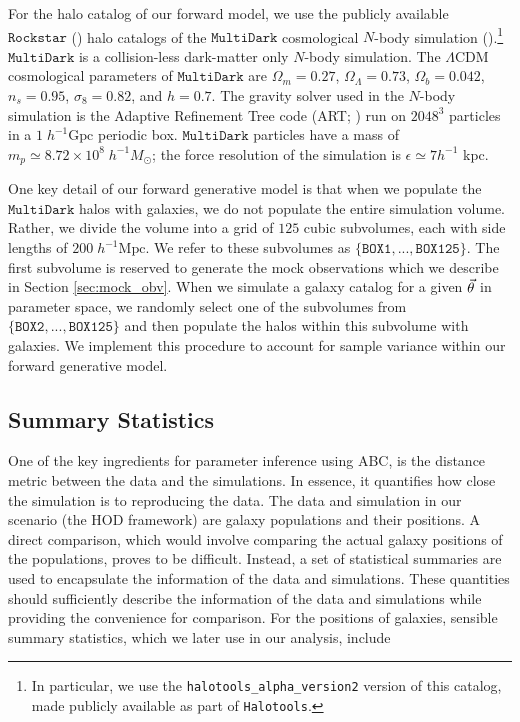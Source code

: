 For the halo catalog of our forward model, we use the publicly available $\mathtt{Rockstar}$ 
(\citealt{rockstar}) halo catalogs of the $\mathtt{MultiDark}$ cosmological $N$-body simulation 
(\citealt{multidark}).\footnote{In particular, we use the {\tt halotools\_alpha\_version2} version of this catalog, made publicly available as part of {\tt Halotools}.} $\mathtt{MultiDark}$ is a collision-less dark-matter only $N$-body simulation. 
The $\Lambda$CDM cosmological parameters of $\mathtt{MultiDark}$ are $\Omega_m = 0.27$, $\Omega_{\Lambda}=0.73$,
$\Omega_{b}=0.042$, $n_{s}=0.95$, $\sigma_{8} = 0.82$, and $h = 0.7$. The gravity solver used in the 
$N$-body simulation is the Adaptive Refinement Tree code (ART; \citealt{art}) run on $2048^3$ particles in a
$1\; h^{-1}\mathrm{Gpc}$ periodic box. $\mathtt{MultiDark}$ particles have a mass of $m_{p} \simeq 8.72 \times 
10^{8} \; h^{-1}M_{\odot}$; the force resolution of the simulation is $\epsilon \simeq 7 h^{-1}$ kpc.

One key detail of our forward generative model is that when we populate the $\mathtt{MultiDark}$ halos 
with galaxies, we do not populate the entire simulation volume. Rather, we divide the volume into a 
grid of $125$ cubic subvolumes, each with side lengths of $200\;h^{-1}\mathrm{Mpc}$. We refer to these 
subvolumes as $\{\mathtt{BOX1}, ..., \mathtt{BOX125}\}$. 
The first subvolume is reserved to generate the mock observations which we describe in Section 
\ref{sec:mock_obv}. When we simulate a galaxy catalog for a given $\vec{\theta}$ in parameter space, 
we randomly select one of the subvolumes from $\{\mathtt{BOX2}, ..., \mathtt{BOX125}\}$ and then 
populate the halos within this subvolume with galaxies. 
We implement this procedure to account for sample variance within our forward generative model. 

\subsection{Summary Statistics}\label{sec:statistics}
One of the key ingredients for parameter inference using ABC, is the distance metric between 
the data and the simulations. In essence, it quantifies how close the simulation 
is to reproducing the data. The data and simulation in our scenario (the HOD framework) 
are galaxy populations and their positions. A direct comparison, which would involve comparing 
the actual galaxy positions of the populations, proves to be difficult. 
Instead, a set of statistical summaries are used to encapsulate the information of the data 
and simulations. These quantities should sufficiently describe the information of the data
and simulations while providing the convenience for comparison. 
For the positions of galaxies, sensible summary statistics, 
which we later use in our analysis, include

